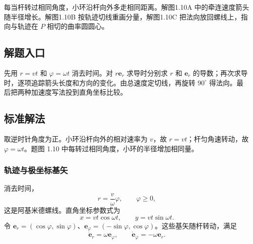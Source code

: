 \documentclass[UTF8,fontset=fandol,a4paper,11pt]{ctexart}
\newcommand{\vect}[1]{\bm{#1}}
\begin{document}
每当杆转过相同角度，小环沿杆向外多走相同距离。解图1.10A 中的牵连速度箭头随半径增长。解图1.10B 按轨迹切线重画分量，解图1.10C 把法向放回螺线上，指向与轨迹在 $P$ 相切的曲率圆圆心。



\subsection*{解题入口}

先用 $r=vt$ 和 $\varphi=\omega t$ 消去时间。对 $r\vect e_r$ 求导时分别求 $r$ 和 $\vect e_r$ 的导数；再次求导时，逐项追踪箭头长度和方向的变化。由总速度定切线，再旋转 $90^\circ$ 得法向。最后把两种加速度写法投到直角坐标比较。



\subsection*{标准解法}

取逆时针角度为正。小环沿杆向外的相对速率为 $v$，故 $r=vt$；杆匀角速转动，故 $\varphi=\omega t$。题图 1.10 中每转过相同角度，小环的半径增加相同量。
\subsubsection*{轨迹与极坐标基矢}
消去时间，
\[
\boxed{r=\frac v\omega\varphi},\qquad \varphi\geq0,
\]
这是阿基米德螺线。直角坐标参数式为
\[
x=vt\cos\omega t,\qquad y=vt\sin\omega t.
\]
令 $\vect e_r=(\cos\varphi,\sin\varphi)$、$\vect e_\varphi=(-\sin\varphi,\cos\varphi)$。这些基矢随杆转动，满足
\[
\dot{\vect e}_r=\omega\vect e_\varphi,\qquad
\dot{\vect e}_\varphi=-\omega\vect e_r.
\]
\end{document}
